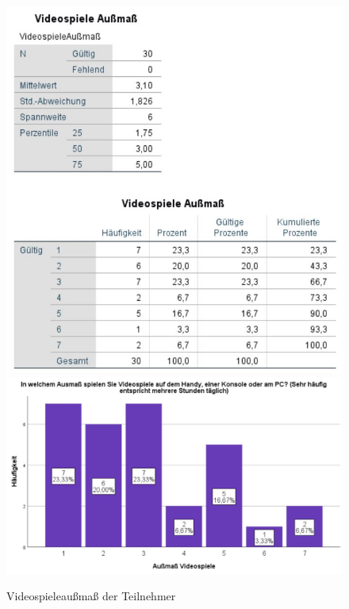 \documentclass[a4paper,11pt]{article}%
\renewcommand{\\}{\vspace*{0.5\baselineskip} \newline}
\begin{document}
	\begin{figure}[H]
	\centering
		\begin{footnotesize}
			\includegraphics[scale=0.6]{Abbildungen/Pre_QuestionnaireStatistiks/teilnehmerVideospieleAußmaß}\\
			\includegraphics[scale=0.5]{Abbildungen/Demographie/teilnehmerVideospieleAußmaß}\\
			\caption{Videospieleaußmaß der Teilnehmer}
			\label{fig:teilnehmerVideospieleAußmaß}
		\end{footnotesize}
	\end{figure}		
\end{document}
